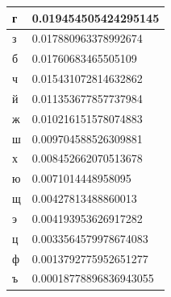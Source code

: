 \begin{table}[]
\begin{tabular}{|l|l|}
г                                & 0.019454505424295145                              \\ \hline
з                                & 0.017880963378992674                              \\ \hline
б                                & 0.01760683465505109                               \\ \hline
ч                                & 0.015431072814632862                              \\ \hline
й                                & 0.011353677857737984                              \\ \hline
ж                                & 0.010216151578074883                              \\ \hline
ш                                & 0.009704588526309881                              \\ \hline
х                                & 0.008452662070513678                              \\ \hline
ю                                & 0.0071014448958095                                \\ \hline
щ                                & 0.00427813488860013                               \\ \hline
э                                & 0.004193953626917282                              \\ \hline
ц                                & 0.0033564579978674083                             \\ \hline
ф                                & 0.0013792775952651277                             \\ \hline
ъ                                & 0.00018778896836943055                            \\ \hline
\end{tabular}
\end{table}



